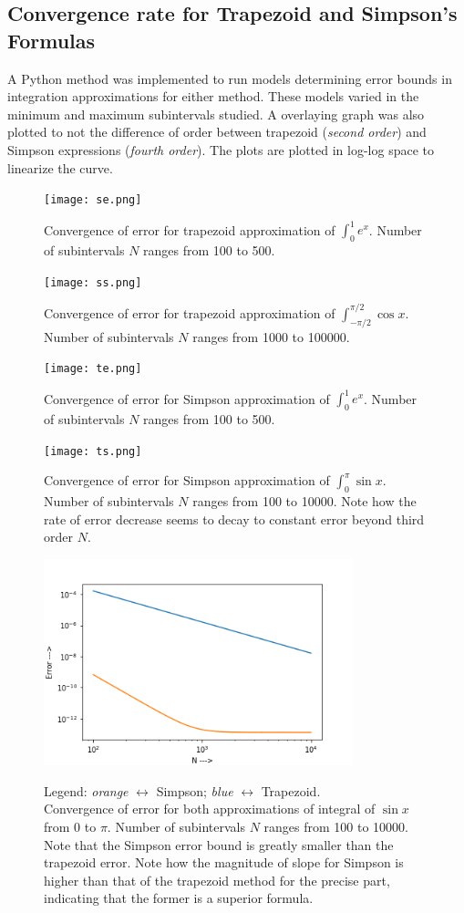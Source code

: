 \documentclass{report}
\begin{document}
\subsection*{Convergence rate for Trapezoid and Simpson's Formulas}
A Python method was implemented to run models determining error bounds in integration approximations for either method. These models varied in the minimum and maximum subintervals studied. A overlaying graph was also plotted to not the difference of order between trapezoid (\emph{second order}) and Simpson expressions (\emph{fourth order}). The plots are plotted in log-log space to linearize the curve.
\begin{figure}[H]
	\centering
	\texttt{[image: se.png]}
	\label{trapezoid1}
	\caption{Convergence of error for trapezoid approximation of $\int_{0}^{1}e^x$. Number of subintervals $N$ ranges from 100 to 500.}
\end{figure}
\begin{figure}[H]
	\centering
	\texttt{[image: ss.png]}
	\label{trapezoid2}
	\caption{Convergence of error for trapezoid approximation of $\int_{-\pi/2}^{\pi/2}\cos x$. Number of subintervals $N$ ranges from 1000 to 100000.}
\end{figure}
\begin{figure}[H]
	\centering
	\texttt{[image: te.png]}
	\label{simpson1}
	\caption{Convergence of error for Simpson approximation of $\int_{0}^{1}e^x$. Number of subintervals $N$ ranges from 100 to 500.}
\end{figure}
\begin{figure}[H]
	\centering
	\texttt{[image: ts.png]}
	\label{simpson2}
	\caption{Convergence of error for Simpson approximation of $\int_{0}^{\pi}\sin x$. Number of subintervals $N$ ranges from 100 to 10000. Note how the rate of error decrease seems to decay to constant error beyond third order $N$. }
\end{figure}
\begin{figure}[H]
	\centering
	\includegraphics[width = 0.8\textwidth]{both.png}
	\label{both}
	\caption{Legend: \emph{orange} $\leftrightarrow$ Simpson; \emph{blue} $\leftrightarrow$ Trapezoid. \\Convergence of error for both approximations of integral of $\sin x$ from 0 to $\pi$. Number of subintervals $N$ ranges from 100 to 10000. Note that the Simpson error bound is greatly smaller than the trapezoid error. Note how the magnitude of slope for Simpson is higher than that of the trapezoid method for the precise part, indicating that the former is a superior formula.}
\end{figure}
\end{document}

